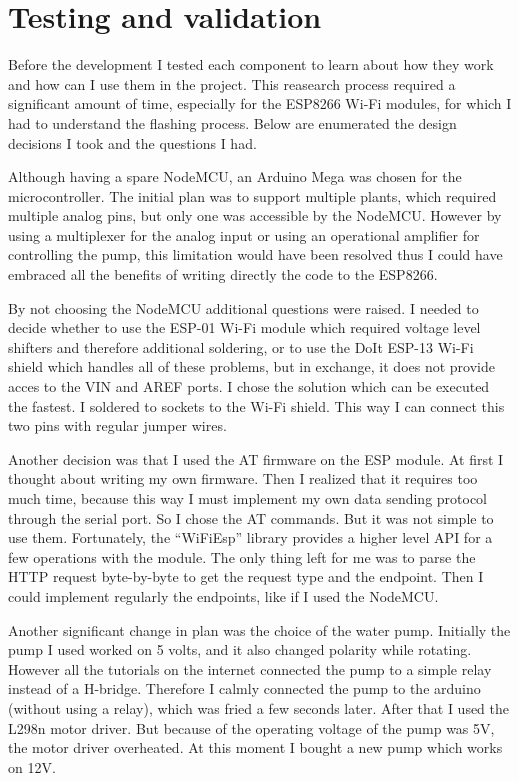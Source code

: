 \chapter{Testing and validation}

Before the development I tested each component to learn about how they work and how can I use them in the project. This reasearch process required a significant amount of time, especially for the ESP8266 Wi-Fi modules, for which I had to understand the flashing process. Below are enumerated the design decisions I took and the questions I had.

Although having a spare NodeMCU, an Arduino Mega was chosen for the microcontroller. The initial plan was to support multiple plants, which required multiple analog pins, but only one was accessible by the NodeMCU. However by using a multiplexer for the analog input or using an operational amplifier for controlling the pump, this limitation would have been resolved thus I could have embraced all the benefits of writing directly the code to the ESP8266.

By not choosing the NodeMCU additional questions were raised. I needed to decide whether to use the ESP-01 Wi-Fi module which required voltage level shifters and therefore additional soldering, or to use the DoIt ESP-13 Wi-Fi shield which handles all of these problems, but in exchange, it does not provide acces to the VIN and AREF ports. I chose the solution which can be executed the fastest. I soldered to sockets to the Wi-Fi shield. This way I can connect this two pins with regular jumper wires.

Another decision was that I used the AT firmware on the ESP module. At first I thought about writing my own firmware. Then I realized that it requires too much time, because this way I must implement my own data sending protocol through the serial port. So I chose the AT commands. But it was not simple to use them. Fortunately, the ``WiFiEsp'' library provides a higher level API for a few operations with the module. The only thing left for me was to parse the HTTP request byte-by-byte to get the request type and the endpoint. Then I could implement regularly the endpoints, like if I used the NodeMCU.

Another significant change in plan was the choice of the water pump. Initially the pump I used worked on 5 volts, and it also changed polarity while rotating. However all the tutorials on the internet connected the pump to a simple relay instead of a H-bridge. Therefore I calmly connected the pump to the arduino (without using a relay), which was fried a few seconds later. After that I used the L298n motor driver. But because of the operating voltage of the pump was 5V, the motor driver overheated. At this moment I bought a new pump which works on 12V.

